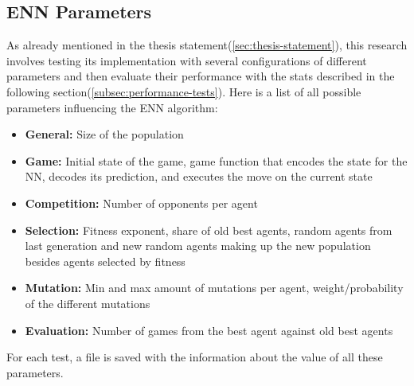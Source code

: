 \documentclass[11pt]{report}
\begin{document}
\begin{enumerate}
    \subsection{ENN Parameters}\label{subsec:enn-parameters}
    As already mentioned in the thesis statement(\ref{sec:thesis-statement}), this research involves testing its implementation with several configurations of different parameters and then evaluate their performance with the stats described in the following section(\ref{subsec:performance-tests}).
    Here is a list of all possible parameters influencing the ENN algorithm:
    \begin{itemize}
        \item \textbf{General:} Size of the population
        \item \textbf{Game:} Initial state of the game, game function that encodes the state for the NN, decodes its prediction, and executes the move on the current state
        \item \textbf{Competition:} Number of opponents per agent
        \item \textbf{Selection:} Fitness exponent, share of old best agents, random agents from last generation and new random agents making up the new population besides agents selected by fitness
        \item \textbf{Mutation:} Min and max amount of mutations per agent, weight/probability of the different mutations
        \item \textbf{Evaluation:} Number of games from the best agent against old best agents

    \end{itemize}
    For each test, a file is saved with the information about the value of all these parameters.


\end{enumerate}
\end{document}
